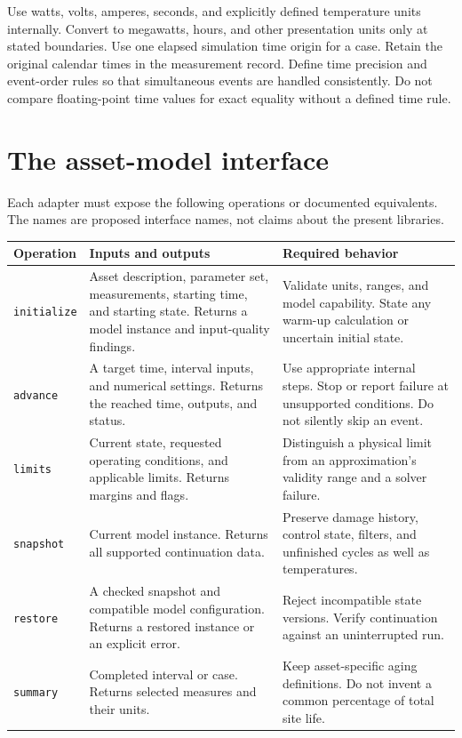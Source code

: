\documentclass[11pt,a4paper]{report}
\begin{document}
Use watts, volts, amperes, seconds, and explicitly defined temperature units internally.
Convert to megawatts, hours, and other presentation units only at stated boundaries.
Use one elapsed simulation time origin for a case.
Retain the original calendar times in the measurement record.
Define time precision and event-order rules so that simultaneous events are handled consistently.
Do not compare floating-point time values for exact equality without a defined time rule.

\section{The asset-model interface}
Each adapter must expose the following operations or documented equivalents.
The names are proposed interface names, not claims about the present libraries.

\begin{longtable}{L{0.20\textwidth}L{0.32\textwidth}L{0.36\textwidth}}
\toprule Operation & Inputs and outputs & Required behavior \\ \midrule\endhead
\texttt{initialize} & Asset description, parameter set, measurements, starting time, and starting state. Returns a model instance and input-quality findings. & Validate units, ranges, and model capability. State any warm-up calculation or uncertain initial state. \\
\texttt{advance} & A target time, interval inputs, and numerical settings. Returns the reached time, outputs, and status. & Use appropriate internal steps. Stop or report failure at unsupported conditions. Do not silently skip an event. \\
\texttt{limits} & Current state, requested operating conditions, and applicable limits. Returns margins and flags. & Distinguish a physical limit from an approximation's validity range and a solver failure. \\
\texttt{snapshot} & Current model instance. Returns all supported continuation data. & Preserve damage history, control state, filters, and unfinished cycles as well as temperatures. \\
\texttt{restore} & A checked snapshot and compatible model configuration. Returns a restored instance or an explicit error. & Reject incompatible state versions. Verify continuation against an uninterrupted run. \\
\texttt{summary} & Completed interval or case. Returns selected measures and their units. & Keep asset-specific aging definitions. Do not invent a common percentage of total site life. \\
\bottomrule
\end{longtable}
\end{document}

